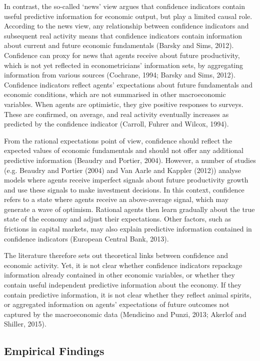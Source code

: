 \documentclass[11pt,]{article}
\begin{document}
In contrast, the so-called `news' view argues that confidence indicators
contain useful predictive information for economic output, but play a
limited causal role. According to the news view, any relationship
between confidence indicators and subsequent real activity means that
confidence indicators contain information about current and future
economic fundamentals (Barsky and Sims, 2012). Confidence can proxy for
news that agents receive about future productivity, which is not yet
reflected in econometricians' information sets, by aggregating
information from various sources (Cochrane, 1994; Barsky and Sims,
2012). Confidence indicators reflect agents' expectations about future
fundamentals and economic conditions, which are not summarised in other
macroeconomic variables. When agents are optimistic, they give positive
responses to surveys. These are confirmed, on average, and real activity
eventually increases as predicted by the confidence indicator (Carroll,
Fuhrer and Wilcox, 1994).

From the rational expectations point of view, confidence should reflect
the expected values of economic fundamentals and should not offer any
additional predictive information (Beaudry and Portier, 2004). However,
a number of studies (e.g. Beaudry and Portier (2004) and Van Aarle and
Kappler (2012)) analyse models where agents receive imperfect signals
about future productivity growth and use these signals to make
investment decisions. In this context, confidence refers to a state
where agents receive an above-average signal, which may generate a wave
of optimism. Rational agents then learn gradually about the true state
of the economy and adjust their expectations. Other factors, such as
frictions in capital markets, may also explain predictive information
contained in confidence indicators (European Central Bank, 2013).

The literature therefore sets out theoretical links between confidence
and economic activity. Yet, it is not clear whether confidence
indicators repackage information already contained in other economic
variables, or whether they contain useful independent predictive
information about the economy. If they contain predictive information,
it is not clear whether they reflect animal spirits, or aggregated
information on agents' expectations of future outcomes not captured by
the macroeconomic data (Mendicino and Punzi, 2013; Akerlof and Shiller,
2015).

\subsection{Empirical Findings}\label{empirical-findings}
\end{document}
